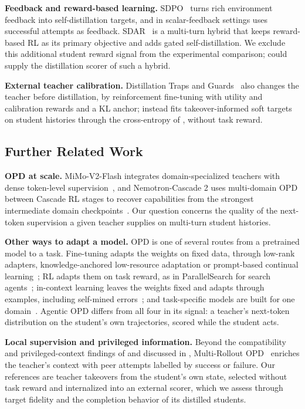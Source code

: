 \textbf{Feedback and reward-based learning.} SDPO~\citep{sdpo2026} turns rich environment feedback into self-distillation targets, and in scalar-feedback settings uses successful attempts as feedback. SDAR~\citep{sdar2026} is a multi-turn hybrid that keeps reward-based RL as its primary objective and adds gated self-distillation. We exclude this additional student reward signal from the experimental comparison; \method{} could supply the distillation scorer of such a hybrid.

\textbf{External teacher calibration.} Distillation Traps and Guards~\citep{trapsguards2026} also changes the teacher before distillation, by reinforcement fine-tuning with utility and calibration rewards and a KL anchor; \method{} instead fits takeover-informed soft targets on student histories through the cross-entropy of , without task reward.

\subsection{Further Related Work}
\label{app:related}

\textbf{OPD at scale.} MiMo-V2-Flash integrates domain-specialized teachers with dense token-level supervision~\citep{mimo2026}, and Nemotron-Cascade 2 uses multi-domain OPD between Cascade RL stages to recover capabilities from the strongest intermediate domain checkpoints~\citep{nemotroncascade22026}. Our question concerns the quality of the next-token supervision a given teacher supplies on multi-turn student histories.

\textbf{Other ways to adapt a model.} OPD is one of several routes from a pretrained model to a task. Fine-tuning adapts the weights on fixed data, through low-rank adapters, knowledge-anchored low-resource adaptation or prompt-based continual learning~\citep{zhao2026mora,zhao2025kalahash,zhao2024reconstruct,zou2025learning}; RL adapts them on task reward, as in ParallelSearch for search agents~\citep{zhao2025parallelsearch}; in-context learning leaves the weights fixed and adapts through examples, including self-mined errors~\citep{zhao2026value}; and task-specific models are built for one domain~\citep{hao2025safemap}. Agentic OPD differs from all four in its signal: a teacher's next-token distribution on the student's own trajectories, scored while the student acts.

\textbf{Local supervision and privileged information.} Beyond the compatibility and privileged-context findings of \citet{li2026bestval} and \citet{rethinkingopsd2026} discussed in , Multi-Rollout OPD~\citep{mropd2026} enriches the teacher's context with peer attempts labelled by success or failure. Our references are teacher takeovers from the student's own state, selected without task reward and internalized into an external scorer, which we assess through target fidelity and the completion behavior of its distilled students.


